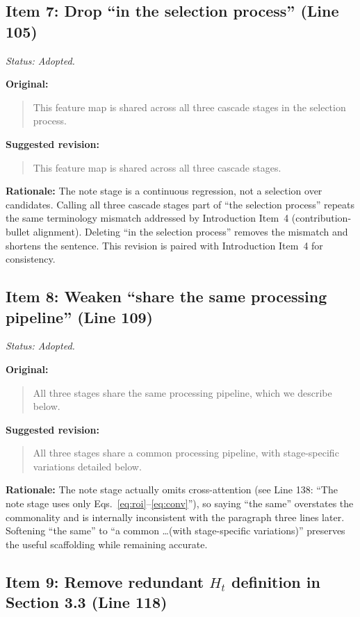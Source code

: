 \documentclass{article}
\begin{document}
\subsection*{Item 7: Drop ``in the selection process'' (Line 105)}

\textit{Status: Adopted.}

\textbf{Original:}
\begin{quote}
This feature map is shared across all three cascade stages in the selection process.
\end{quote}

\textbf{Suggested revision:}
\begin{quote}
This feature map is shared across all three cascade stages.
\end{quote}

\textbf{Rationale:}
The note stage is a continuous regression, not a selection over candidates. Calling all three cascade stages part of ``the selection process'' repeats the same terminology mismatch addressed by Introduction Item~4 (contribution-bullet alignment). Deleting ``in the selection process'' removes the mismatch and shortens the sentence. This revision is paired with Introduction Item~4 for consistency.

\subsection*{Item 8: Weaken ``share the same processing pipeline'' (Line 109)}

\textit{Status: Adopted.}

\textbf{Original:}
\begin{quote}
All three stages share the same processing pipeline, which we describe below.
\end{quote}

\textbf{Suggested revision:}
\begin{quote}
All three stages share a common processing pipeline, with stage-specific variations detailed below.
\end{quote}

\textbf{Rationale:}
The note stage actually omits cross-attention (see Line 138: ``The note stage uses only Eqs.~\ref{eq:roi}--\ref{eq:conv}''), so saying ``the same'' overstates the commonality and is internally inconsistent with the paragraph three lines later. Softening ``the same'' to ``a common \ldots (with stage-specific variations)'' preserves the useful scaffolding while remaining accurate.

\subsection*{Item 9: Remove redundant $H_t$ definition in Section 3.3 (Line 118)}
\end{document}

